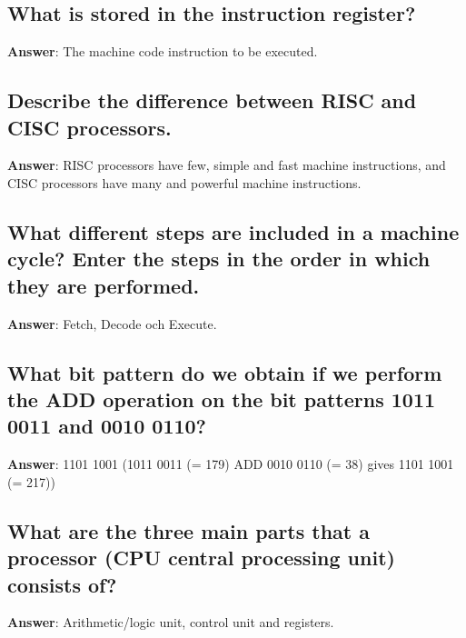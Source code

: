 \documentclass[a4paper,11pt,oneside]{article}
\begin{document}
\begin{sloppypar}
\subsection{What is stored in the instruction register?}

\label{q:96:sa:en:True}

\textbf{Answer}: The machine code instruction to be executed.



\subsection{Describe the difference between RISC and CISC processors.}

\label{q:97:sa:en:True}

\textbf{Answer}: RISC processors have few, simple and fast machine instructions, and CISC processors have many and powerful machine instructions.



\subsection{What different steps are included in a machine cycle? Enter the steps in the order in which they are performed.}

\label{q:98:sa:en:True}

\textbf{Answer}: Fetch, Decode och Execute.



\subsection{What bit pattern do we obtain if we perform the ADD operation on the bit patterns 1011 0011 and 0010 0110?}

\label{q:99:sa:en:True}

\textbf{Answer}: 1101 1001 (1011 0011 (= 179) ADD 0010 0110 (= 38) gives 1101 1001 (= 217))



\subsection{What are the three main parts that a processor (CPU {\textendash} central processing unit) consists of?}

\label{q:100:sa:en:True}

\textbf{Answer}: Arithmetic/logic unit, control unit and registers.




\end{sloppypar}
\end{document}
